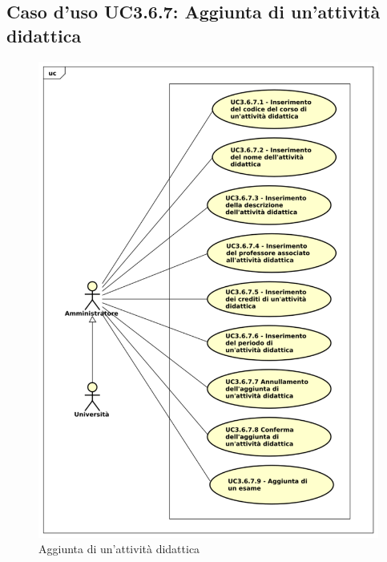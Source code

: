 \subsection{Caso d'uso \texorpdfstring{UC3.6.7}{UC3.6.7}: Aggiunta di un'attività didattica}
\begin{figure} [H]
	\centering
	\includegraphics[scale=0.45]{./img/UC3-6-7.pdf}
	\caption{Aggiunta di un'attività didattica}\label{}
\end{figure}
